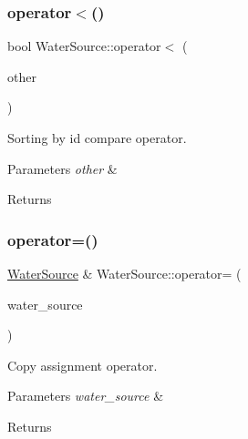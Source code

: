 \mbox{\label{classWaterSource_accb044cc78f9a444ca18bf7283b5b596_accb044cc78f9a444ca18bf7283b5b596}} 
\subsubsection{\texorpdfstring{operator$<$()}{operator<()}}
{\footnotesize\ttfamily bool Water\+Source\+::operator$<$ (\begin{DoxyParamCaption}\item[{const \mbox{\hyperlink{classWaterSource}{Water\+Source}} $\ast$}]{other }\end{DoxyParamCaption})}

Sorting by id compare operator. 
\begin{DoxyParams}{Parameters}
{\em other} & \\
\hline
\end{DoxyParams}
\begin{DoxyReturn}{Returns}

\end{DoxyReturn}
\mbox{\label{classWaterSource_aafdaafb023a35186ae01d213665b5e27_aafdaafb023a35186ae01d213665b5e27}} 
\subsubsection{\texorpdfstring{operator=()}{operator=()}}
{\footnotesize\ttfamily \mbox{\hyperlink{classWaterSource}{Water\+Source}} \& Water\+Source\+::operator= (\begin{DoxyParamCaption}\item[{const \mbox{\hyperlink{classWaterSource}{Water\+Source}} \&}]{water\+\_\+source }\end{DoxyParamCaption})}

Copy assignment operator. 
\begin{DoxyParams}{Parameters}
{\em water\+\_\+source} & \\
\hline
\end{DoxyParams}
\begin{DoxyReturn}{Returns}

\end{DoxyReturn}
\mbox{\label{classWaterSource_af25e06ec954898f3392cb125d2f2c2ad_af25e06ec954898f3392cb125d2f2c2ad}} 

